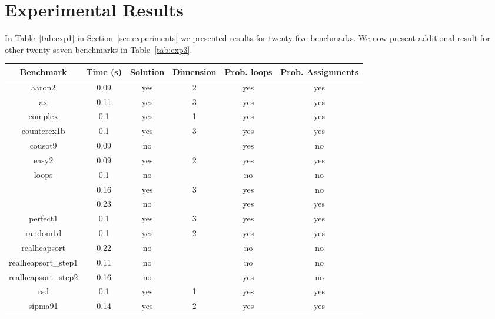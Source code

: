 
\section{Experimental Results}\label{sec:app_ex}
In Table~\ref{tab:exp1} in Section~\ref{sec:experiments} we presented results for twenty five benchmarks.
We now present additional result for other twenty seven benchmarks in Table~\ref{tab:exp3}.



\begin{center}
\begin{table}[]
  \centering
   \begin{tabular}{c|c|c|c|c|c}
    
{Benchmark} & {Time (s)} & {Solution} & {Dimension} & {Prob. loops} & {Prob. Assignments} \\\hline \hline
{aaron2} & {0.09} & {yes} & {2} & {yes} & {yes} \\\hline
{ax} & {0.11} & {yes} & {3} & {yes} & {yes} \\\hline
{complex} & {0.1} & {yes} & {1} & {yes} & {yes} \\\hline
{counterex1b} & {0.1} & {yes} & {3} & {yes} & {yes} \\\hline
{cousot9} & {0.09} & {no} & {} & {yes} & {no} \\\hline
{easy2} & {0.09} & {yes} & {2} & {yes} & {yes} \\\hline
{loops} & {0.1} & {no} & {} & {no} & {no} \\\hline
{\multirow{2}{*}{nestedloop}} & {0.16} & {yes} & {3} & {yes} & {no} \\\cline{2-6}
{} & {0.23} & {no} & {} & {yes} & {yes} \\\hline
{perfect1} & {0.1} & {yes} & {3} & {yes} & {yes} \\\hline
{random1d} & {0.1} & {yes} & {2} & {yes} & {yes} \\\hline
{realheapsort} & {0.22} & {no} & {} & {no} & {no} \\\hline
{realheapsort\_step1} & {0.11} & {no} & {} & {no} & {no} \\\hline
{realheapsort\_step2} & {0.16} & {no} & {} & {yes} & {no} \\\hline
{rsd} & {0.1} & {yes} & {1} & {yes} & {yes} \\\hline
{sipma91} & {0.14} & {yes} & {2} & {yes} & {yes} \\\hline

\end{tabular}
\end{table}
\end{center}
